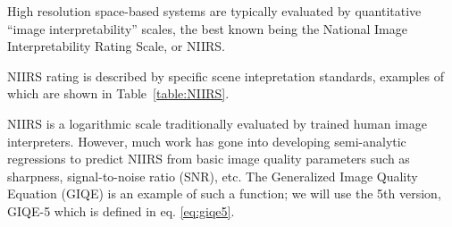 \documentclass[10pt,journal]{IEEEtran}  %
\begin{document}
High resolution space-based systems are typically evaluated by quantitative ``image interpretability'' scales, the best known being the National Image Interpretability Rating Scale, or NIIRS.

NIIRS rating is described by specific scene intepretation standards, examples of which are shown in Table~\ref{table:NIIRS}\cite{niirs}.

\begin{table}[h!t]
\centering
\caption{NIIRS definitions}
\label{table:NIIRS}
\end{table}

NIIRS is a logarithmic scale traditionally evaluated by trained human image interpreters.  However, much work has gone into developing semi-analytic regressions to predict NIIRS from basic image quality parameters such as sharpness, signal-to-noise ratio (SNR), etc. The Generalized Image Quality Equation (GIQE) is an example of such a function; we will use the 5th version, GIQE-5 which is defined in eq. \eqref{eq:giqe5}.
\end{document}
